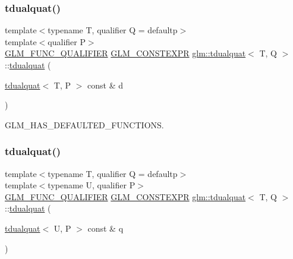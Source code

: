 \subsubsection{\texorpdfstring{tdualquat()}{tdualquat()}\hspace{0.1cm}{\footnotesize\ttfamily [10/11]}}
{\footnotesize\ttfamily template$<$typename T, qualifier Q = defaultp$>$ \\
template$<$qualifier P$>$ \\
\mbox{\hyperlink{setup_8hpp_a33fdea6f91c5f834105f7415e2a64407}{G\+L\+M\+\_\+\+F\+U\+N\+C\+\_\+\+Q\+U\+A\+L\+I\+F\+I\+ER}} \mbox{\hyperlink{setup_8hpp_a08b807947b47031d3a511f03f89645ad}{G\+L\+M\+\_\+\+C\+O\+N\+S\+T\+E\+X\+PR}} \mbox{\hyperlink{structglm_1_1tdualquat}{glm\+::tdualquat}}$<$ T, Q $>$\+::\mbox{\hyperlink{structglm_1_1tdualquat}{tdualquat}} (\begin{DoxyParamCaption}\item[{\mbox{\hyperlink{structglm_1_1tdualquat}{tdualquat}}$<$ T, P $>$ const \&}]{d }\end{DoxyParamCaption})}



G\+L\+M\+\_\+\+H\+A\+S\+\_\+\+D\+E\+F\+A\+U\+L\+T\+E\+D\+\_\+\+F\+U\+N\+C\+T\+I\+O\+NS. 

\mbox{\label{structglm_1_1tdualquat_a00f0899c1213aa991a65dfaf8d15fba5}} 
\subsubsection{\texorpdfstring{tdualquat()}{tdualquat()}\hspace{0.1cm}{\footnotesize\ttfamily [11/11]}}
{\footnotesize\ttfamily template$<$typename T, qualifier Q = defaultp$>$ \\
template$<$typename U, qualifier P$>$ \\
\mbox{\hyperlink{setup_8hpp_a33fdea6f91c5f834105f7415e2a64407}{G\+L\+M\+\_\+\+F\+U\+N\+C\+\_\+\+Q\+U\+A\+L\+I\+F\+I\+ER}} \mbox{\hyperlink{setup_8hpp_a08b807947b47031d3a511f03f89645ad}{G\+L\+M\+\_\+\+C\+O\+N\+S\+T\+E\+X\+PR}} \mbox{\hyperlink{structglm_1_1tdualquat}{glm\+::tdualquat}}$<$ T, Q $>$\+::\mbox{\hyperlink{structglm_1_1tdualquat}{tdualquat}} (\begin{DoxyParamCaption}\item[{\mbox{\hyperlink{structglm_1_1tdualquat}{tdualquat}}$<$ U, P $>$ const \&}]{q }\end{DoxyParamCaption})}



